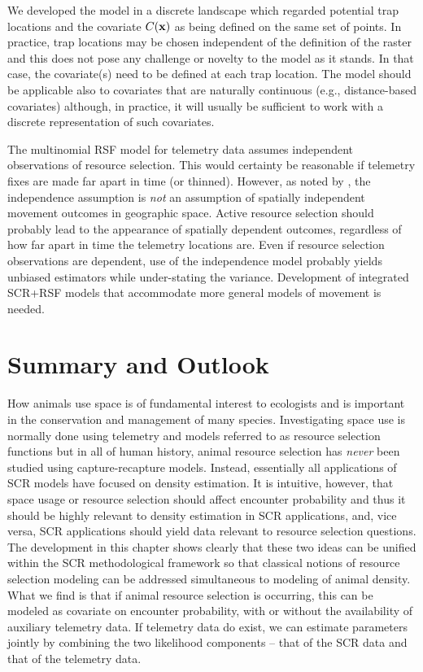 We developed the model in a discrete landscape which regarded
potential trap
locations and the covariate $C({\bf x})$ as being defined on the same
set of points. In practice, trap locations may be chosen
independent of the definition of the raster and this does not pose any
challenge or novelty to the model as it stands. In that
case, the covariate(s) need to be defined at each trap location.
The model should be applicable also to covariates that are naturally
continuous (e.g., distance-based covariates) although, in practice, it
will usually be sufficient to work with a discrete representation of
such covariates.

The multinomial RSF model for telemetry data assumes independent
observations of resource selection.  This would certainty be
reasonable if telemetry fixes are made far apart in time (or thinned).
However, as noted by \citet{royle_etal:2012mee}, the independence
assumption is {\it not} an assumption of spatially independent
movement outcomes in geographic space.  Active resource selection
should probably lead to the appearance of spatially dependent
outcomes, regardless of how far apart in time the telemetry locations
are.  Even if resource selection observations are dependent, use of
the independence model probably yields unbiased estimators while
under-stating the variance.  Development of integrated SCR+RSF models
that accommodate more general models of movement is needed.




\section{Summary and Outlook}


How animals use space is of fundamental interest to ecologists and is
important in the conservation and management of many
species. Investigating space use is normally done using telemetry and
models referred to as resource selection functions
\citep{manly_etal:2002} but in all of human
history, animal resource selection has {\it never} been studied using
capture-recapture models. Instead, essentially all applications of SCR
models have focused on density estimation.  It is intuitive, however,
that space usage or resource selection should affect encounter probability and thus it
should be highly relevant to density estimation in SCR applications,
and, vice versa, SCR applications should yield data relevant to
resource selection questions. The development in this chapter shows
clearly that these two ideas can be unified within the SCR
methodological framework so that classical notions of resource
selection modeling can be addressed simultaneous to modeling of
animal density. What we find is that if animal resource selection is
occurring, this can be modeled as covariate on encounter probability,
with or without the availability of auxiliary telemetry data. If
telemetry data do exist, we can estimate parameters jointly by
combining the two likelihood components -- that of the SCR data and
that of the telemetry data.

